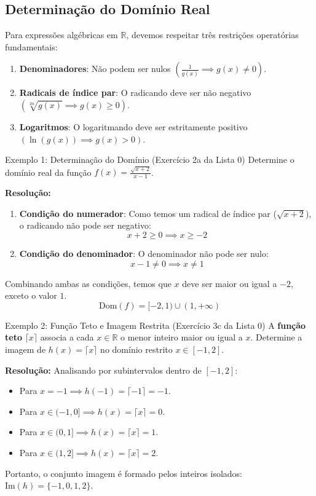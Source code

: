 \documentclass[12pt,a4paper]{article}
\begin{document}
\subsection*{Determinação do Domínio Real}
Para expressões algébricas em $\mathbb{R}$, devemos respeitar três restrições operatórias fundamentais:
\begin{enumerate}
    \item \textbf{Denominadores}: Não podem ser nulos $\left(\frac{1}{g(x)} \implies g(x) \neq 0\right)$.
    \item \textbf{Radicais de índice par}: O radicando deve ser não negativo $\left(\sqrt[2n]{g(x)} \implies g(x) \ge 0\right)$.
    \item \textbf{Logaritmos}: O logaritmando deve ser estritamente positivo $\left(\ln(g(x)) \implies g(x) > 0\right)$.
\end{enumerate}

\begin{exemplo}{Exemplo 1: Determinação do Domínio (Exercício 2a da Lista 0)}
    Determine o domínio real da função $f(x) = \frac{\sqrt{x+2}}{x-1}$.
    
    \tcblower
    \textbf{Resolução:}
    \begin{enumerate}
        \item \textbf{Condição do numerador}: Como temos um radical de índice par ($\sqrt{x+2}$), o radicando não pode ser negativo:
        $$x + 2 \ge 0 \implies x \ge -2$$
        \item \textbf{Condição do denominador}: O denominador não pode ser nulo:
        $$x - 1 \neq 0 \implies x \neq 1$$
    \end{enumerate}
    Combinando ambas as condições, temos que $x$ deve ser maior ou igual a $-2$, exceto o valor $1$.
    $$\text{Dom}(f) = [-2, 1) \cup (1, +\infty)$$
\end{exemplo}

\begin{exemplo}{Exemplo 2: Função Teto e Imagem Restrita (Exercício 3c da Lista 0)}
    A \textbf{função teto} $\lceil x \rceil$ associa a cada $x \in \mathbb{R}$ o menor inteiro maior ou igual a $x$. Determine a imagem de $h(x) = \lceil x \rceil$ no domínio restrito $x \in [-1, 2]$.

    \tcblower
    \textbf{Resolução:} Analisando por subintervalos dentro de $[-1, 2]$:
    \begin{itemize}
        \item Para $x = -1 \implies h(-1) = \lceil -1 \rceil = -1$.
        \item Para $x \in (-1, 0] \implies h(x) = \lceil x \rceil = 0$.
        \item Para $x \in (0, 1] \implies h(x) = \lceil x \rceil = 1$.
        \item Para $x \in (1, 2] \implies h(x) = \lceil x \rceil = 2$.
    \end{itemize}
    Portanto, o conjunto imagem é formado pelos inteiros isolados: $\text{Im}(h) = \{-1, 0, 1, 2\}$.
\end{exemplo}
\end{document}
